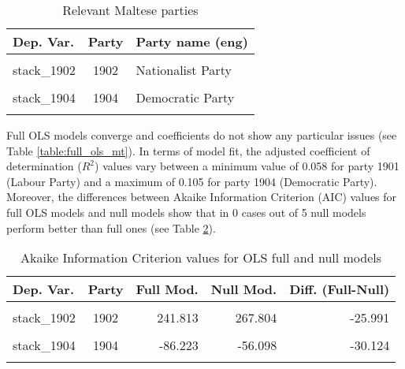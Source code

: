 \documentclass[
]{article}
\begin{document}
\begin{table}[!h]

\caption{\label{tab:unnamed-chunk-122}Relevant Maltese parties \label{table:relprty_tab_mt}}
\centering
\begin{tabular}[t]{lcl}
\toprule
Dep. Var. & Party & Party name (eng)\\
\midrule
\cellcolor{gray!6}{stack\_1901} & \cellcolor{gray!6}{1901} & \cellcolor{gray!6}{Labour Party}\\
stack\_1902 & 1902 & Nationalist Party\\
\cellcolor{gray!6}{stack\_1903} & \cellcolor{gray!6}{1903} & \cellcolor{gray!6}{Democratic Alternative}\\
stack\_1904 & 1904 & Democratic Party\\
\cellcolor{gray!6}{stack\_1905} & \cellcolor{gray!6}{1905} & \cellcolor{gray!6}{Imperium Europa}\\
\bottomrule
\end{tabular}
\end{table}

Full OLS models converge and coefficients do not show any particular issues (see Table
\ref{table:full_ols_mt}).
In terms of model fit, the adjusted coefficient of determination (\(R^2\)) values vary between
a minimum value of 0.058
for party 1901
(Labour Party)
and a maximum of 0.105
for party 1904
(Democratic Party).
Moreover, the differences between Akaike Information Criterion (AIC) values for full OLS models and null
models show that in 0 cases out of 5 null models perform better than full ones (see Table
\ref{table:ols_aic_mt}).

\begin{table}[!h]

\caption{\label{tab:unnamed-chunk-123}Akaike Information Criterion values for OLS full and null models 
        \label{table:ols_aic_mt}}
\centering
\begin{tabular}[t]{lcrrr}
\toprule
Dep. Var. & Party & Full Mod. & Null Mod. & Diff. (Full-Null)\\
\midrule
\cellcolor{gray!6}{stack\_1901} & \cellcolor{gray!6}{1901} & \cellcolor{gray!6}{328.713} & \cellcolor{gray!6}{339.868} & \cellcolor{gray!6}{-11.155}\\
stack\_1902 & 1902 & 241.813 & 267.804 & -25.991\\
\cellcolor{gray!6}{stack\_1903} & \cellcolor{gray!6}{1903} & \cellcolor{gray!6}{2.060} & \cellcolor{gray!6}{20.944} & \cellcolor{gray!6}{-18.884}\\
stack\_1904 & 1904 & -86.223 & -56.098 & -30.124\\
\cellcolor{gray!6}{stack\_1905} & \cellcolor{gray!6}{1905} & \cellcolor{gray!6}{-59.754} & \cellcolor{gray!6}{-47.221} & \cellcolor{gray!6}{-12.532}\\
\bottomrule
\end{tabular}
\end{table}
\end{document}
